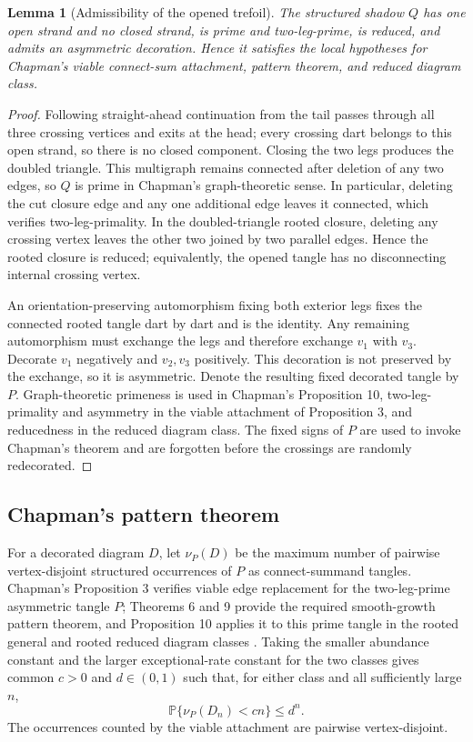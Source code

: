 \documentclass[9pt,twoside]{pnas-new}
\newtheorem{lemma}[theorem]{Lemma}
\theoremstyle{definition}
\theoremstyle{remark}
\renewcommand{\Pr}{\mathbb{P}}
\begin{document}
\begin{lemma}[Admissibility of the opened trefoil]
\label{lem:Q-admissible}
The structured shadow $Q$ has one open strand and no closed strand, is prime and two-leg-prime, is reduced, and admits an asymmetric decoration. Hence it satisfies the local hypotheses for Chapman's viable connect-sum attachment, pattern theorem, and reduced diagram class.
\end{lemma}

\begin{proof}
Following straight-ahead continuation from the tail passes through all three crossing vertices and exits at the head; every crossing dart belongs to this open strand, so there is no closed component. Closing the two legs produces the doubled triangle. This multigraph remains connected after deletion of any two edges, so $Q$ is prime in Chapman's graph-theoretic sense. In particular, deleting the cut closure edge and any one additional edge leaves it connected, which verifies two-leg-primality. In the doubled-triangle rooted closure, deleting any crossing vertex leaves the other two joined by two parallel edges. Hence the rooted closure is reduced; equivalently, the opened tangle has no disconnecting internal crossing vertex.

An orientation-preserving automorphism fixing both exterior legs fixes the connected rooted tangle dart by dart and is the identity. Any remaining automorphism must exchange the legs and therefore exchange $v_1$ with $v_3$. Decorate $v_1$ negatively and $v_2,v_3$ positively. This decoration is not preserved by the exchange, so it is asymmetric. Denote the resulting fixed decorated tangle by $P$. Graph-theoretic primeness is used in Chapman's Proposition 10, two-leg-primality and asymmetry in the viable attachment of Proposition 3, and reducedness in the reduced diagram class. The fixed signs of $P$ are used to invoke Chapman's theorem and are forgotten before the crossings are randomly redecorated.
\end{proof}

\subsection{Chapman's pattern theorem}
For a decorated diagram $D$, let $\nu_P(D)$ be the maximum number of pairwise vertex-disjoint structured occurrences of $P$ as connect-summand tangles. Chapman's Proposition 3 verifies viable edge replacement for the two-leg-prime asymmetric tangle $P$; Theorems 6 and 9 provide the required smooth-growth pattern theorem, and Proposition 10 applies it to this prime tangle in the rooted general and rooted reduced diagram classes \cite{chapman2017}.  Taking the smaller abundance constant and the larger exceptional-rate constant for the two classes gives common $c>0$ and $d\in(0,1)$ such that, for either class and all sufficiently large $n$,
\begin{equation}
 \Pr\{\nu_P(D_n)<cn\}\le d^n.
 \label{eq:chapman-pattern-input}
\end{equation}
The occurrences counted by the viable attachment are pairwise vertex-disjoint.
\end{document}
